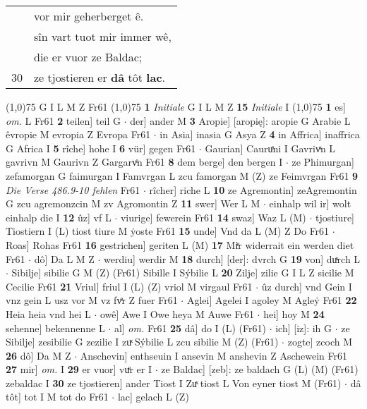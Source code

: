 \documentclass[8pt,a4paper,notitlepage]{article}
\begin{document}
\begin{table}[ht]
\begin{minipage}[t]{0.5\linewidth}
\begin{tabular}{rl}
 & vor mir geherberget ê.\\ 
 & sîn vart tuot mir immer wê,\\ 
 & die er vuor ze Baldac;\\ 
30 & ze tjostieren er \textbf{dâ} tôt \textbf{lac}.\\ 
\end{tabular}
\scriptsize
\line(1,0){75} \newline
G I L M Z Fr61 \newline
\line(1,0){75} \newline
\textbf{1} \textit{Initiale} G I L M Z  \textbf{15} \textit{Initiale} I  \newline
\line(1,0){75} \newline
\textbf{1} es] \textit{om.} L Fr61 \textbf{2} teilen] teil G  $\cdot$ der] ander M \textbf{3} Aropie] [aropię]: aropie G Arabie L êvropie M evropia Z Evropa Fr61  $\cdot$ in Asia] inasia G Asya Z \textbf{4} in Affrica] inaffrica G Africa I \textbf{5} rîche] hohe I \textbf{6} vür] gegen Fr61  $\cdot$ Gaurian] Cauruͤni I Gavrivͯn L gavrivn M Gaurivn Z Gargarvͤn Fr61 \textbf{8} dem berge] den bergen I  $\cdot$ ze Phimurgan] zefamorgan G faimurgan I Famvrgan L zcu famorgan M (Z) ze Feimvrgan Fr61 \textbf{9} \textit{Die Verse 486.9-10 fehlen} Fr61   $\cdot$ rîcher] riche L \textbf{10} ze Agremontin] zeAgremontin G zcu agremonzcin M zv Agromontin Z \textbf{11} swer] Wer L M  $\cdot$ einhalp wil ir] wolt einhalp die I \textbf{12} ûz] vf L  $\cdot$ viurige] fewerein Fr61 \textbf{14} swaz] Waz L (M)  $\cdot$ tjostiure] Tiostiern I (L) tiost tiure M ẏoste Fr61 \textbf{15} unde] Vnd da L (M) Z Do Fr61  $\cdot$ Roas] Rohas Fr61 \textbf{16} gestrichen] geriten L (M) \textbf{17} Miͤr widerrait ein werden diet Fr61  $\cdot$ dô] Da L M Z  $\cdot$ werdiu] werdir M \textbf{18} durch] [der]: dvrch G \textbf{19} von] duͯrch L  $\cdot$ Sibilje] sibilie G M (Z) (Fr61) Sibille I Sýbilie L \textbf{20} Zilje] zilie G I L Z sicilie M Cecilie Fr61 \textbf{21} Vriul] friul I (L) (Z) vriol M virgaul Fr61  $\cdot$ ûz durch] vnd Gein I vnz gein L usz vor M vz fvͤr Z fuer Fr61  $\cdot$ Aglei] Agelei I agoley M Agleẏ Fr61 \textbf{22} Heia heia vnd hei L  $\cdot$ owê] Awe I Owe heya M Auwe Fr61  $\cdot$ hei] hoy M \textbf{24} sehenne] bekennenne L  $\cdot$ al] \textit{om.} Fr61 \textbf{25} dâ] do I (L) (Fr61)  $\cdot$ ich] [iz]: ih G  $\cdot$ ze Sibilje] zesibilie G zezilie I zuͯ Sýbilie L zcu sibilie M (Z) (Fr61)  $\cdot$ zogte] zcoch M \textbf{26} dô] Da M Z  $\cdot$ Anschevin] enthseuin I ansevin M anshevin Z Aschewein Fr61 \textbf{27} mir] \textit{om.} I \textbf{29} er vuor] vuͤr er I  $\cdot$ ze Baldac] [zeb]: ze baldach G (L) (M) (Fr61) zebaldac I \textbf{30} ze tjostieren] ander Tiost I Zuͯ tiost L Von eyner tiost M (Fr61)  $\cdot$ dâ tôt] tot I M tot do Fr61  $\cdot$ lac] gelach L (Z) \newline

\end{minipage}
\end{table}
\end{document}
